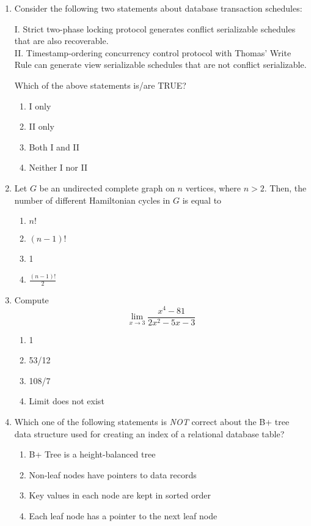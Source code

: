 \documentclass[12pt]{article}
\begin{document}
\begin{enumerate}[label=Q.\arabic*]
\item Consider the following two statements about database transaction schedules:

I. Strict two-phase locking protocol generates conflict serializable schedules that are also recoverable.\\
II. Timestamp-ordering concurrency control protocol with Thomas' Write Rule can generate view serializable schedules that are not conflict serializable.

Which of the above statements is/are TRUE?
\begin{multicols}{2}
\begin{enumerate}[label=(\Alph*)]
\item I only
\item II only
\item Both I and II
\item Neither I nor II
\end{enumerate}
\end{multicols}

\item Let $G$ be an undirected complete graph on $n$ vertices, where $n > 2$. Then, the number of different Hamiltonian cycles in $G$ is equal to
\begin{multicols}{2}
\begin{enumerate}[label=(\Alph*)]
\item $n!$
\item $(n - 1)!$
\item 1
\item $\frac{(n - 1)!}{2}$
\end{enumerate}
\end{multicols}

\item Compute \[
\lim_{x \to 3} \frac{x^4 - 81}{2x^2 - 5x - 3}
\]
\begin{multicols}{2}
\begin{enumerate}[label=(\Alph*)]
\item 1
\item 53/12
\item 108/7
\item Limit does not exist
\end{enumerate}
\end{multicols}

\item Which one of the following statements is \textit{NOT} correct about the B+ tree data structure used for creating an index of a relational database table?
\begin{multicols}{2}
\begin{enumerate}[label=(\Alph*)]
\item B+ Tree is a height-balanced tree
\item Non-leaf nodes have pointers to data records
\item Key values in each node are kept in sorted order
\item Each leaf node has a pointer to the next leaf node
\end{enumerate}
\end{multicols}


\end{enumerate}
\end{document}
